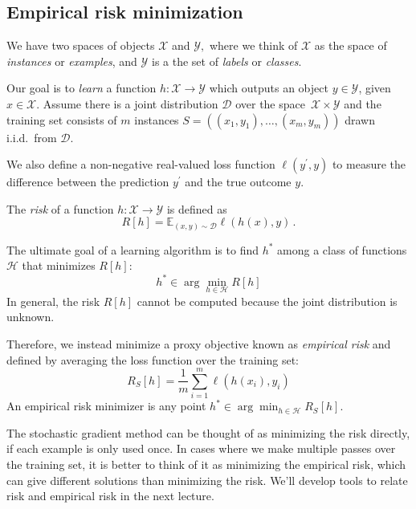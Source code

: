 \subsection{Empirical risk minimization}
We have two spaces of objects $\mathcal{X}$ and ${\mathcal{Y}},$ where we think
of $\mathcal{X}$ as the space of \emph{instances} or \emph{examples}, and
$\mathcal{Y}$ is a the set of \emph{labels} or \emph{classes}.

Our goal is to \emph{learn} a function $h\colon\mathcal{X}\to\mathcal{Y}$ which
outputs an object $y\in \mathcal{Y}$, given $ x\in \mathcal{X}$.  Assume there
is a joint distribution $\mathcal{D}$ over the space~$\mathcal{X} \times
\mathcal{Y}$ and the training set consists of $m$ instances $S=((x_1, y_1), \ldots,
(x_m,y_m))$ drawn i.i.d.~from $\mathcal{D}$.

We also define a non-negative real-valued loss function $\ell(y^\prime,y)$ to
measure the difference between the prediction $y^\prime$ and the true outcome
$y$.

\begin{definition}
The \emph{risk} of a function $h\colon\mathcal{X}\to\mathcal{Y}$ is defined as 
\begin{equation*}
    R[h] = \mathbb{E}_{(x,y)\sim\mathcal{D}} \ell(h(x),y)\,.
\end{equation*}
\end{definition}
The ultimate goal of a learning algorithm is to find $h^*$ among a class of functions $\mathcal{H}$ that minimizes $R[h]$:
\begin{equation*}
    h^* \in \arg\min_{h \in \mathcal{H}} R[h]
\end{equation*}
In general, the risk $R[h]$ cannot be computed because the joint distribution is unknown. 

Therefore, we instead minimize a proxy objective known as 
\emph{empirical risk} and defined by averaging the loss function over 
the training set:
\begin{equation*}
    R_S[h] = \frac{1}{m} \sum^m_{i=1}\ell(h(x_i),y_i)
\end{equation*}
An empirical risk minimizer is any point $h^* \in \arg\min_{h \in \mathcal{H}}
R_S[h]$.

The stochastic gradient method can be thought of as minimizing the risk
directly, if each example is only used once. In cases where we make multiple
passes over the training set, it is better to think of it as minimizing the
empirical risk, which can give different solutions than minimizing the risk.
We'll develop tools to relate risk and empirical risk in the next lecture.


